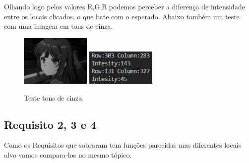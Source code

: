 \documentclass{bmvc2k}
\begin{document}
Olhando logo pelos valores R,G,B podemos perceber a diferença de intensidade
entre os locais clicados, o que bate com o esperado. Abaixo também um teste com uma imagem
em tons de cinza.

\begin{figure}[!h]
    \centering
    \includegraphics[width=0.300\textwidth]{Figs/maigray.jpg}
    \includegraphics[width=0.300\textwidth]{Figs/r15.png}
    \vspace*{-2mm}\caption{Teste tons de cinza.}
\end{figure}

\subsection{Requisito 2, 3 e 4}

Como os Requisitos que sobraram tem funções parecidas mas diferentes locais alvo vamos
compara-los no mesmo tópico.
\end{document}
